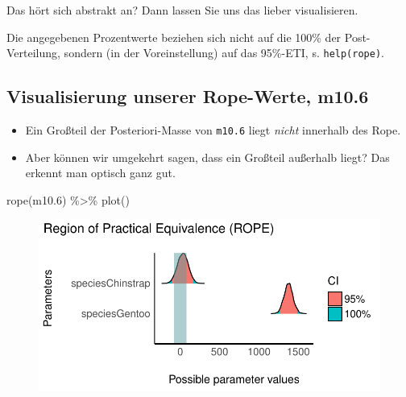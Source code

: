 \documentclass[
  a4paper,
  DIV=11]{scrreprt}
\newenvironment{Shaded}{\begin{snugshade}}{\end{snugshade}}
\newcommand{\FloatTok}[1]{\textcolor[rgb]{0.68,0.00,0.00}{#1}}
\newcommand{\FunctionTok}[1]{\textcolor[rgb]{0.28,0.35,0.67}{#1}}
\newcommand{\NormalTok}[1]{\textcolor[rgb]{0.00,0.23,0.31}{#1}}
\newcommand{\SpecialCharTok}[1]{\textcolor[rgb]{0.37,0.37,0.37}{#1}}
\providecommand{\tightlist}{%
  \setlength{\itemsep}{0pt}\setlength{\parskip}{0pt}}\usepackage{longtable,booktabs,array}
\theoremstyle{definition}
\theoremstyle{remark}
\begin{document}
Das hört sich abstrakt an? Dann lassen Sie uns das lieber visualisieren.

\begin{tcolorbox}[enhanced jigsaw, leftrule=.75mm, left=2mm, bottomrule=.15mm, opacityback=0, coltitle=black, colbacktitle=quarto-callout-note-color!10!white, opacitybacktitle=0.6, rightrule=.15mm, toptitle=1mm, colback=white, colframe=quarto-callout-note-color-frame, arc=.35mm, toprule=.15mm, breakable, titlerule=0mm, bottomtitle=1mm, title=\textcolor{quarto-callout-note-color}{\faInfo}\hspace{0.5em}{Hinweis}]
Die angegebenen Prozentwerte beziehen sich nicht auf die 100\% der
Post-Verteilung, sondern (in der Voreinstellung) auf das 95\%-ETI, s.
\texttt{help(rope)}.
\end{tcolorbox}

\hypertarget{visualisierung-unserer-rope-werte-m10.6}{%
\subsection{Visualisierung unserer Rope-Werte,
m10.6}\label{visualisierung-unserer-rope-werte-m10.6}}

\begin{itemize}
\tightlist
\item
  Ein Großteil der Posteriori-Masse von \texttt{m10.6} liegt
  \emph{nicht} innerhalb des Rope.
\item
  Aber können wir umgekehrt sagen, dass ein Großteil außerhalb liegt?
  Das erkennt man optisch ganz gut.
\end{itemize}

\begin{Shaded}
\begin{Highlighting}[]
\FunctionTok{rope}\NormalTok{(m10}\FloatTok{.6}\NormalTok{) }\SpecialCharTok{\%\textgreater{}\%} \FunctionTok{plot}\NormalTok{()}
\end{Highlighting}
\end{Shaded}

\begin{figure}[H]

{\centering \includegraphics{./metrische-AV_files/figure-pdf/unnamed-chunk-37-1.pdf}

}

\end{figure}
\end{document}
